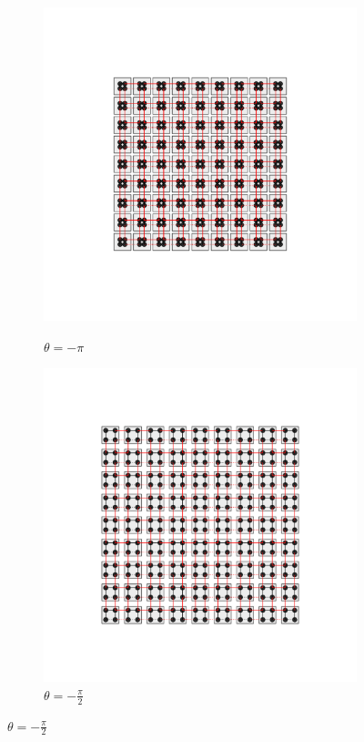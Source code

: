
\begin{figure}[h!]
     \centering
    \captionsetup[sub]{font=small}
     \begin{minipage}[h!]{1\textwidth}
         \begin{subfigure}[b!]{0.2 \textwidth}
             \caption{$\theta = - \pi$}
             \includegraphics[width=\textwidth]{Imagenes/Models/Model_pump/square_pump_model_xy_0.pdf}
             \label{}
         \end{subfigure}\hspace*{-0.5em}
         \begin{subfigure}[b!]{0.2 \textwidth}
             \caption*{$\theta = -\frac{\pi}{2}$}
             \includegraphics[width=\textwidth]{Imagenes/Models/Model_pump/square_pump_model_xy_5.pdf}

\end{subfigure}
\end{minipage}
\end{figure}
